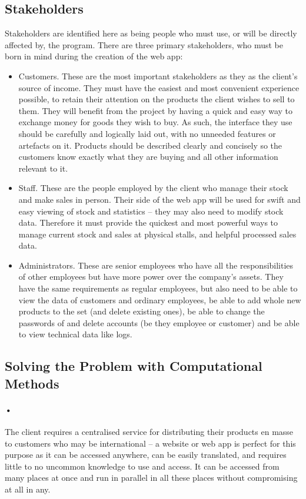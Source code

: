 \documentclass{article}
\begin{document}
    \subsection{Stakeholders}
    Stakeholders are identified here as being people who must use, or will be directly affected by, the program. 
    There are three primary stakeholders, who must be born in mind during the creation of the web app:
    \begin{itemize}
    \item Customers.
    These are the most important stakeholders as they as the client’s source of income. 
    They must have the easiest and most convenient experience possible, to retain their attention on the products the client wishes to sell to them. 
    They will benefit from the project by having a quick and easy way to exchange money for goods they wish to buy. 
    As such, the interface they use should be carefully and logically laid out, with no unneeded features or artefacts on it. 
    Products should be described clearly and concisely so the customers know exactly what they are buying and all other information relevant to it.
    \item Staff. 
    These are the people employed by the client who manage their stock and make sales in person. 
    Their side of the web app will be used for swift and easy viewing of stock and statistics – they may also need to modify stock data. 
    Therefore it must provide the quickest and most powerful ways to manage current stock and sales at physical stalls, and helpful processed sales data.
    \item Administrators. 
    These are senior employees who have all the responsibilities of other employees but have more power over the company’s assets. 
    They have the same requirements as regular employees, but also need to be able to view the data of customers and ordinary employees, be able to add whole new products to the set (and delete existing ones), be able to change the passwords of and delete accounts (be they employee or customer) and be able to view technical data like logs.
    \end{itemize}
    
    \subsection{Solving the Problem with Computational Methods}
    \paragraph{•}
    The client requires a centralised service for distributing their products en masse to customers who may be international – a website or web app is perfect for this purpose as it can be accessed anywhere, can be easily translated, and requires little to no uncommon knowledge to use and access. 
    It can be accessed from many places at once and run in parallel in all these places without compromising at all in any.
\end{document}
